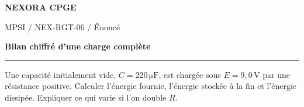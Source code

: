 \documentclass[11pt,a4paper]{article}
\begin{document}
{\small\bfseries\color{nexorablue} NEXORA CPGE}\par
{\small MPSI / NEX-RGT-06 / Énoncé}\par
{\LARGE\bfseries Bilan chiffré d’une charge complète}\par
\vspace{0.25em}\hrule\vspace{0.6em}

Une capacité initialement vide, $C=220\,\mathrm{\mu F}$, est chargée sous $E=9{,}0\,\mathrm V$ par une résistance positive. Calculer l’énergie fournie, l’énergie stockée à la fin et l’énergie dissipée. Expliquer ce qui varie si l’on double $R$.
\end{document}
